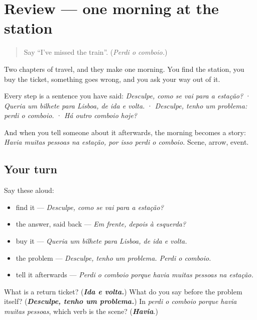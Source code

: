\section[(review)]{Review — one morning at the station}

\label{lesson:PT-C264-revisao-estacao}



\begin{quote}
Say \textquotedblleft{}I've missed the train\textquotedblright{}. (\emph{Perdi o comboio.})
\end{quote}

\begin{grammarlens}[title={What you've built}]
Two chapters of travel, and they make one morning. You find the station, you buy the ticket, something goes wrong, and you ask your way out of it.

Every step is a sentence you have said: \emph{Desculpe, como se vai para a estação?} · \emph{Queria um bilhete para Lisboa, de ida e volta.} · \emph{Desculpe, tenho um problema: perdi o comboio.} · \emph{Há outro comboio hoje?}

And when you tell someone about it afterwards, the morning becomes a story: \emph{Havia muitas pessoas na estação, por isso perdi o comboio.} Scene, arrow, event.
\end{grammarlens}

\subsection*{Your turn}
Say these aloud:

\begin{itemize}
\raggedright
  \item find it — \emph{Desculpe, como se vai para a estação?}
  \item the answer, said back — \emph{Em frente, depois à esquerda?}
  \item buy it — \emph{Queria um bilhete para Lisboa, de ida e volta.}
  \item the problem — \emph{Desculpe, tenho um problema. Perdi o comboio.}
  \item tell it afterwards — \emph{Perdi o comboio porque havia muitas pessoas na estação.}
\end{itemize}

\begin{tcolorbox}[breakable,colback=teal!4,colframe=teal!35!black,title={Before you move on}]
What is a return ticket? (\emph{\textbf{Ida e volta.}}) What do you say before the problem itself? (\emph{\textbf{Desculpe, tenho um problema.}}) In \emph{perdi o comboio porque havia muitas pessoas}, which verb is the scene? (\emph{\textbf{Havia}}.)
\end{tcolorbox}
